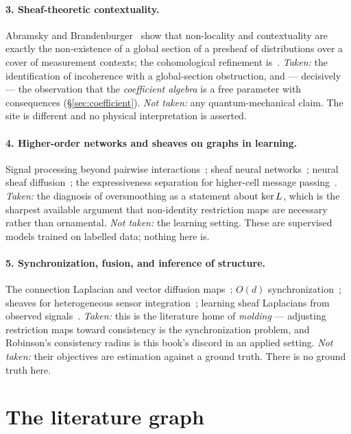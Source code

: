 \paragraph{3. Sheaf-theoretic contextuality.}
Abramsky and Brandenburger~\cite{AbramskyBrandenburger} show that
non-locality and contextuality are exactly the non-existence of a global
section of a presheaf of distributions over a cover of measurement contexts;
the cohomological refinement is~\cite{ABKLM}. \emph{Taken:} the identification
of incoherence with a global-section obstruction, and --- decisively --- the
observation that the \emph{coefficient algebra} is a free parameter with
consequences (\S\ref{sec:coefficient}). \emph{Not taken:} any quantum-mechanical
claim. The site is different and no physical interpretation is asserted.

\paragraph{4. Higher-order networks and sheaves on graphs in learning.}
Signal processing beyond pairwise interactions~\cite{Battiston,SchaubTSP};
sheaf neural networks~\cite{HansenGebhart}; neural sheaf
diffusion~\cite{BodnarSheaf}; the expressiveness separation for higher-cell
message passing~\cite{BodnarSIN}. \emph{Taken:} the diagnosis of oversmoothing
as a statement about $\ker L$, which is the sharpest available argument that
non-identity restriction maps are necessary rather than ornamental.
\emph{Not taken:} the learning setting. These are supervised models trained on
labelled data; nothing here is.

\paragraph{5. Synchronization, fusion, and inference of structure.}
The connection Laplacian and vector diffusion maps~\cite{SingerWu}; $O(d)$
synchronization~\cite{BSS}; sheaves for heterogeneous sensor
integration~\cite{RobinsonTSP,RobinsonSensor}; learning sheaf Laplacians from
observed signals~\cite{HansenGhristLearning}. \emph{Taken:} this is the
literature home of \emph{molding} --- adjusting restriction maps toward
consistency is the synchronization problem, and Robinson's consistency radius
is this book's discord in an applied setting. \emph{Not taken:} their
objectives are estimation against a ground truth. There is no ground truth
here.

\section{The literature graph}

